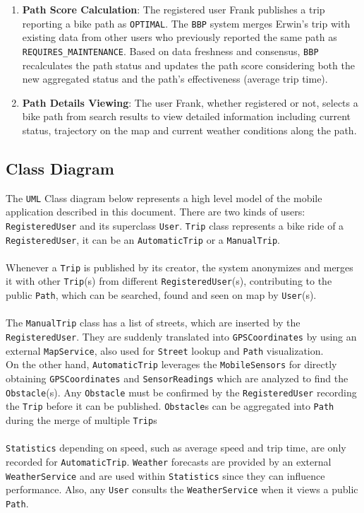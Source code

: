 \begin{enumerate}
    \item \textbf{Path Score Calculation}: The registered user Frank publishes a trip reporting a bike path as \texttt{OPTIMAL}. The \texttt{BBP} system merges Erwin's trip with existing data from other users who previously reported the same path as \texttt{REQUIRES\_MAINTENANCE}. Based on data freshness and consensus, \texttt{BBP} recalculates the path status and updates the path score considering both the new aggregated status and the path's effectiveness (average trip time).

    \item \textbf{Path Details Viewing}: The user Frank, whether registered or not, selects a bike path from search results to view detailed information including current status, trajectory on the map and current weather conditions along the path.
    
\end{enumerate}


\subsection{Class Diagram}
\label{sec:class_diagram}

The \texttt{UML} Class diagram below represents a high level model of the mobile application described in this document. There are two kinds of users: \texttt{RegisteredUser} and its superclass \texttt{User}. \texttt{Trip} class represents a bike ride of a \texttt{RegisteredUser}, it can be an \texttt{AutomaticTrip} or a \texttt{ManualTrip}. \\\\
Whenever a \texttt{Trip} is published by its creator, the system anonymizes and merges it with other \texttt{Trip}(s) from different \texttt{RegisteredUser}(s), contributing to the public \texttt{Path}, which can be searched, found and seen on map by \texttt{User}(s). 
\\\\
The \texttt{ManualTrip} class has a list of streets, which are inserted by the \texttt{RegisteredUser}. They are suddenly translated into \texttt{GPSCoordinates} by using an external \texttt{MapService}, also used for \texttt{Street} lookup and \texttt{Path} visualization. \\
On the other hand, \texttt{AutomaticTrip} leverages the \texttt{MobileSensors} for directly obtaining \texttt{GPSCoordinates} and \texttt{SensorReadings} which are analyzed to find the \texttt{Obstacle}(s). Any \texttt{Obstacle} must be confirmed by the \texttt{RegisteredUser} recording the \texttt{Trip} before it can be published. \texttt{Obstacle}s can be aggregated into \texttt{Path} during the merge of multiple \texttt{Trip}s
\\\\
\texttt{Statistics} depending on speed, such as average speed and trip time, are only recorded for \texttt{AutomaticTrip}. \texttt{Weather} forecasts are provided by an external \texttt{WeatherService} and are used within \texttt{Statistics} since they can influence performance. Also, any \texttt{User} consults the \texttt{WeatherService} when it views a public \texttt{Path}.

